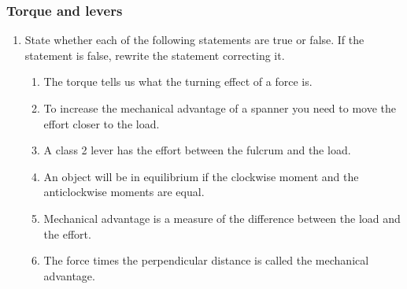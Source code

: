\begin{eocexercises}{}
\subsubsection{Torque and levers}
\begin{enumerate}

\item {State whether each of the following statements are true or false. If the statement is false, rewrite the statement correcting it.
\begin{enumerate}
\item The torque tells us what the turning effect of a force is.
\item To increase the mechanical advantage of a spanner you need to move the effort closer to the load.
\item A class 2 lever has the effort between the fulcrum and the load.
\item An object will be in equilibrium if the clockwise moment and the anticlockwise moments are equal.
\item Mechanical advantage is a measure of the difference between the load and the effort.
\item The force times the perpendicular distance is called the mechanical advantage.
\end{enumerate}}


\end{enumerate}
\end{eocexercises}
